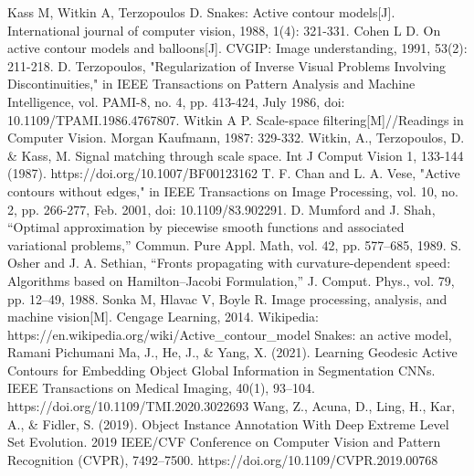 \documentclass[journal]{IEEEtran}
\begin{document}

\ifCLASSOPTIONcaptionsoff
  \newpage
\fi


\begin{thebibliography}{1}

Kass M, Witkin A, Terzopoulos D. Snakes: Active contour models[J]. International journal of computer vision, 1988, 1(4): 321-331.
Cohen L D. On active contour models and balloons[J]. CVGIP: Image understanding, 1991, 53(2): 211-218.
D. Terzopoulos, "Regularization of Inverse Visual Problems Involving Discontinuities," in IEEE Transactions on Pattern Analysis and Machine Intelligence, vol. PAMI-8, no. 4, pp. 413-424, July 1986, doi: 10.1109/TPAMI.1986.4767807.
Witkin A P. Scale-space filtering[M]//Readings in Computer Vision. Morgan Kaufmann, 1987: 329-332.
Witkin, A., Terzopoulos, D. \& Kass, M. Signal matching through scale space. Int J Comput Vision 1, 133-144 (1987). https://doi.org/10.1007/BF00123162
T. F. Chan and L. A. Vese, "Active contours without edges," in IEEE Transactions on Image Processing, vol. 10, no. 2, pp. 266-277, Feb. 2001, doi: 10.1109/83.902291.
D. Mumford and J. Shah, “Optimal approximation by piecewise smooth functions and associated variational problems,” Commun. Pure Appl. Math, vol. 42, pp. 577–685, 1989.
S. Osher and J. A. Sethian, “Fronts propagating with curvature-dependent speed: Algorithms based on Hamilton–Jacobi Formulation,” J. Comput. Phys., vol. 79, pp. 12–49, 1988.
Sonka M, Hlavac V, Boyle R. Image processing, analysis, and machine vision[M]. Cengage Learning, 2014.
Wikipedia: https://en.wikipedia.org/wiki/Active\_contour\_model
Snakes: an active model, Ramani Pichumani
Ma, J., He, J., \& Yang, X. (2021). Learning Geodesic Active Contours for Embedding Object Global Information in Segmentation CNNs. IEEE Transactions on Medical Imaging, 40(1), 93–104. https://doi.org/10.1109/TMI.2020.3022693
Wang, Z., Acuna, D., Ling, H., Kar, A., \& Fidler, S. (2019). Object Instance Annotation With Deep Extreme Level Set Evolution. 2019 IEEE/CVF Conference on Computer Vision and Pattern Recognition (CVPR), 7492–7500. https://doi.org/10.1109/CVPR.2019.00768

\end{thebibliography}
\end{document}
